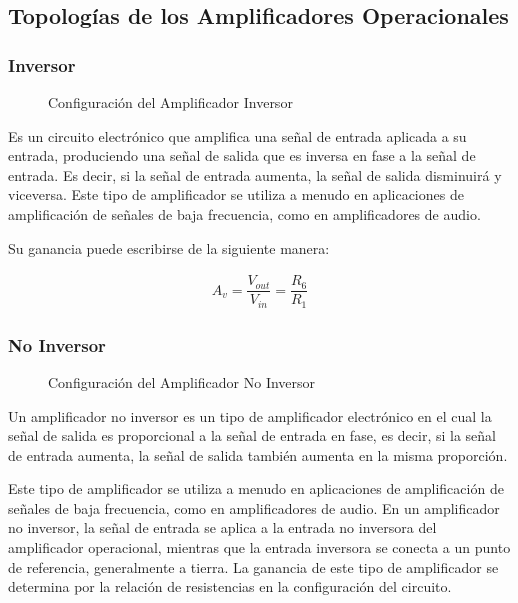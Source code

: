     \subsection{Topologías de los Amplificadores Operacionales}

        \subsubsection{Inversor}
        
            \begin{figure}[H]
              \centering              
              
              \caption{Configuración del Amplificador Inversor}
              \label{fig:inversor0}
            \end{figure}
            
            Es un circuito electrónico que amplifica una señal de entrada aplicada a su entrada, produciendo una señal de salida que es inversa en fase a la señal de entrada. Es decir, si la señal de entrada aumenta, la señal de salida disminuirá y viceversa. Este tipo de amplificador se utiliza a menudo en aplicaciones de amplificación de señales de baja frecuencia, como en amplificadores de audio. 
            
            Su ganancia puede escribirse de la siguiente manera: 

            \begin{gather}
                A_v=\dfrac{V_{out}}{V_{in}}=\dfrac{R_6}{R_1}
            \end{gather}

        \subsubsection{No Inversor}

            \begin{figure}[H]
              \centering              
              \caption{Configuración del Amplificador No Inversor}
              \label{fig:no_inversor0}
            \end{figure}

            Un amplificador no inversor es un tipo de amplificador electrónico en el cual la señal de salida es proporcional a la señal de entrada en fase, es decir, si la señal de entrada aumenta, la señal de salida también aumenta en la misma proporción. 
            
            Este tipo de amplificador se utiliza a menudo en aplicaciones de amplificación de señales de baja frecuencia, como en amplificadores de audio. En un amplificador no inversor, la señal de entrada se aplica a la entrada no inversora del amplificador operacional, mientras que la entrada inversora se conecta a un punto de referencia, generalmente a tierra. La ganancia de este tipo de amplificador se determina por la relación de resistencias en la configuración del circuito. 
            
